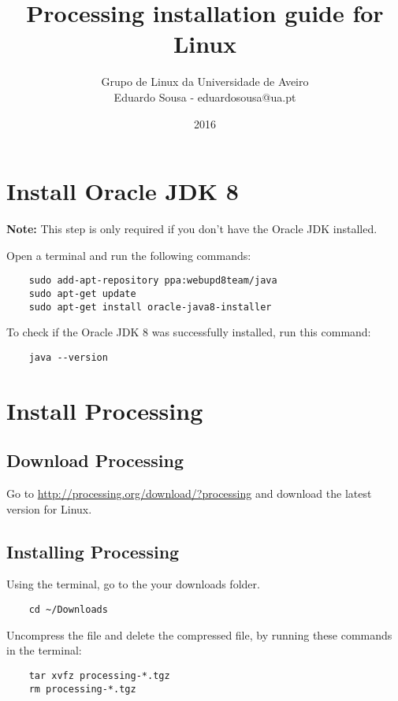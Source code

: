 \documentclass{article}
\title{Processing installation guide for Linux}
\author{Grupo de Linux da Universidade de Aveiro\\Eduardo Sousa - eduardosousa@ua.pt}
\date{2016}
\begin{document}
\maketitle

\section{Install Oracle JDK 8}

\textbf{Note:} This step is only required if you don't have the Oracle JDK installed.

Open a terminal and run the following commands:

\begin{lstlisting}
	sudo add-apt-repository ppa:webupd8team/java
	sudo apt-get update
	sudo apt-get install oracle-java8-installer
\end{lstlisting}

To check if the Oracle JDK 8 was successfully installed, run this command:

\begin{lstlisting}
	java --version
\end{lstlisting}

\section{Install Processing}

\subsection{Download Processing}

Go to \url{http://processing.org/download/?processing} and download the latest version for Linux.

\subsection{Installing Processing}

Using the terminal, go to the your downloads folder.

\begin{lstlisting}
	cd ~/Downloads
\end{lstlisting}

Uncompress the file and delete the compressed file, by running these commands in the terminal:

\begin{lstlisting}
	tar xvfz processing-*.tgz
	rm processing-*.tgz
\end{lstlisting}
\end{document}
